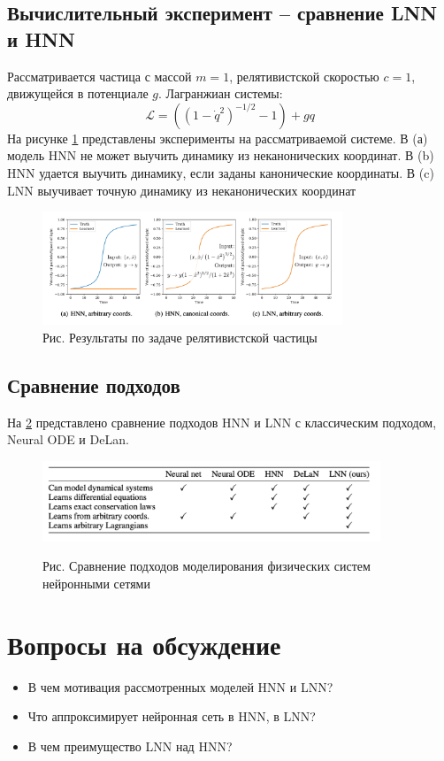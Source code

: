 \subsection{Вычислительный эксперимент -- сравнение LNN и HNN}
Рассматривается частица с массой $m=1$, релятивистской скоростью $c=1$, движущейся в потенциале $g$. Лагранжиан системы: 
$$\mathcal{L}=\left(\left(1-\dot{q}^{2}\right)^{-1 / 2}-1\right)+g q$$
На рисунке \ref{hnn_vs_lnn} представлены эксперименты на рассматриваемой системе. В (а) модель HNN не может выучить динамику из неканонических координат. В (b) HNN удается выучить динамику, если заданы канонические координаты. В (c) LNN выучивает точную динамику из неканонических координат
\begin{figure}[h]
	\centering
	\label{hnn_vs_lnn}
	\includegraphics[width=0.8\textwidth]{chapters/severilov_s2/pics/hnn_vs_lnn}
	\caption{Рис. Результаты по задаче релятивистской частицы}
\end{figure}	
\newpage
\subsection{Сравнение подходов}
На \ref{comparison} представлено сравнение подходов HNN и LNN с классическим подходом, Neural ODE и DeLan.
\begin{figure}[h]
	\centering
	\includegraphics[width=0.9\textwidth]{chapters/severilov_s2/pics/comparison}
	\label{comparison}
	\caption{Рис. Сравнение подходов моделирования физических систем нейронными сетями}
\end{figure}


\section{Вопросы на обсуждение}

\begin{itemize}
	\item В чем мотивация рассмотренных моделей HNN и LNN?
	\item Что аппроксимирует нейронная сеть в HNN, в LNN?
	\item В чем преимущество LNN над HNN? 
\end{itemize}